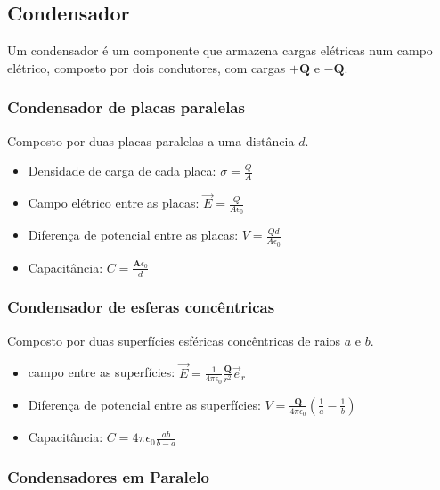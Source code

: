 \documentclass[11pt]{article}
\begin{document}
\break

\subsection{Condensador}

Um condensador é um componente que armazena cargas elétricas num campo elétrico, composto por dois condutores, com cargas $+\mathbf{Q}$ e $-\mathbf{Q}$.

\subsubsection{Condensador de placas paralelas}

Composto por duas placas paralelas a uma distância $d$.

\begin{itemize}
    \item Densidade de carga de cada placa: $\displaystyle \sigma = \frac{Q}{A}$
    \item Campo elétrico entre as placas: $\displaystyle \overrightarrow{E} = \frac{Q}{A\epsilon_0}$
    \item Diferença de potencial entre as placas: $\displaystyle V = \frac{Qd}{A\epsilon_0}$
    \item Capacitância: $\displaystyle C = \frac{\mathbf{A}\epsilon_0}{d}$
\end{itemize}

\subsubsection{Condensador de esferas concêntricas}

Composto por duas superfícies esféricas concêntricas de raios $a$ e $b$.

\begin{itemize}
    \item campo entre as superfícies: $\displaystyle \overrightarrow{E} = \frac{1}{4\pi\epsilon_0}\frac{\mathbf{Q}}{r^2}\overrightarrow{e}_r$
    \item Diferença de potencial entre as superfícies: $\displaystyle V = \frac{\mathbf{Q}}{4\pi\epsilon_0}\left(\frac{1}{a}-\frac{1}{b}\right)$
    \item Capacitância: $\displaystyle C = 4\pi\epsilon_0\frac{ab}{b-a}$
\end{itemize}

\subsubsection{Condensadores em Paralelo}
\end{document}
